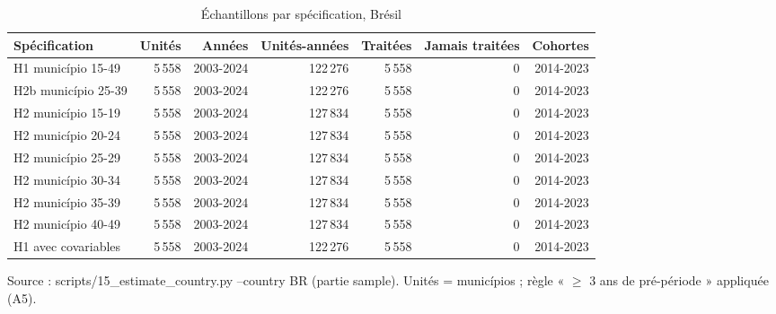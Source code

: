 \begin{table}[htbp]\centering
\begin{threeparttable}
\caption{Échantillons par spécification, Brésil}\label{tab:br_sample}
\small
\begin{tabular}{lrrrrrr}
\toprule
Spécification & Unités & Années & Unités-années & Traitées & Jamais traitées & Cohortes \\
\midrule
H1 município 15-49 & 5\,558 & 2003-2024 & 122\,276 & 5\,558 & 0 & 2014-2023 \\
H2b município 25-39 & 5\,558 & 2003-2024 & 122\,276 & 5\,558 & 0 & 2014-2023 \\
H2 município 15-19 & 5\,558 & 2003-2024 & 127\,834 & 5\,558 & 0 & 2014-2023 \\
H2 município 20-24 & 5\,558 & 2003-2024 & 127\,834 & 5\,558 & 0 & 2014-2023 \\
H2 município 25-29 & 5\,558 & 2003-2024 & 127\,834 & 5\,558 & 0 & 2014-2023 \\
H2 município 30-34 & 5\,558 & 2003-2024 & 127\,834 & 5\,558 & 0 & 2014-2023 \\
H2 município 35-39 & 5\,558 & 2003-2024 & 127\,834 & 5\,558 & 0 & 2014-2023 \\
H2 município 40-49 & 5\,558 & 2003-2024 & 127\,834 & 5\,558 & 0 & 2014-2023 \\
H1 avec covariables & 5\,558 & 2003-2024 & 122\,276 & 5\,558 & 0 & 2014-2023 \\
\bottomrule
\end{tabular}
\begin{tablenotes}\footnotesize
\item Source : scripts/15\_estimate\_country.py --country BR (partie sample). Unités = municípios ; règle « $\geq$ 3 ans de pré-période » appliquée (A5).
\end{tablenotes}
\end{threeparttable}
\end{table}
